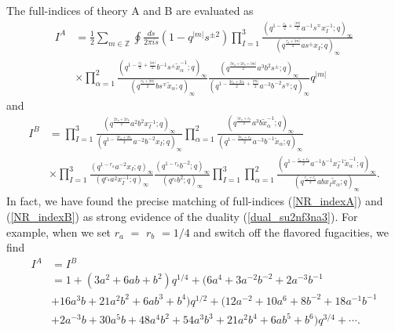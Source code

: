\documentclass[12pt]{article}
\numberwithin{equation}{section}
\begin{document}
The full-indices of theory A and B are evaluated as
\begin{align}
\label{NR_indexA}
I^A&=
\frac12 \sum_{m\in \mathbb{Z}}
\oint \frac{ds}{2\pi is}
(1-q^{|m|}s^{\pm2})
\prod_{I=1}^3 
\frac{
(q^{1-\frac{r_a}{2}+\frac{|m|}{2}}a^{-1}s^{\mp}x_{I}^{-1};q)_{\infty}
}
{
(q^{\frac{r_a+|m|}{2}}as^{\pm}x_{I};q)_{\infty}
}
\nonumber\\
&\times 
\prod_{\alpha=1}^2
\frac{
(q^{1-\frac{r_b}{2}+\frac{|m|}{2}}b^{-1}s^{\pm}\tilde{x}_{\alpha}^{-1};q)_{\infty}
}
{
(q^{\frac{r_b+|m|}{2}}bs^{\mp}\tilde{x}_{\alpha};q)_{\infty}
}
\frac{
(q^{\frac{3r_a+2r_b+|m|}{2}}a^3 b^2 s^{\pm};q)_{\infty}
}
{
(q^{1-\frac{3r_a+2r_b}{2}+\frac{|m|}{2}}a^{-3}b^{-2}s^{\mp};q)_{\infty}
}q^{|m|}
\end{align}
and 
\begin{align}
\label{NR_indexB}
I^B&=
\prod_{I=1}^3 
\frac{
(q^{\frac{2r_a+2r_b}{2}}a^2b^2x_I^{-1};q)_{\infty}
}
{
(q^{1-\frac{2r_a+2r_b}{2}}a^{-2}b^{-2}x_I;q)_{\infty}
}
\prod_{\alpha=1}^2
\frac{
(q^{\frac{3r_a+r_b}{2}}a^3b\tilde{x}_\alpha^{-1};q)_{\infty}
}
{
(q^{1-\frac{3r_a+r_b}{2}}a^{-3}b^{-1}\tilde{x}_\alpha;q)_{\infty}
}
\nonumber\\
&\times 
\prod_{I=1}^3 
\frac{
(q^{1-r_a}a^{-2}x_I;q)_{\infty}
}
{
(q^{r_a}a^2x_I^{-1};q)_{\infty}
}
\frac{
(q^{1-r_b}b^{-2};q)_{\infty}
}
{
(q^{r_b}b^2;q)_{\infty}
}
\prod_{I=1}^3
\prod_{\alpha=1}^2
\frac{
(q^{1-\frac{r_a+r_b}{2}}a^{-1}b^{-1}x_I^{-1}\tilde{x}_{\alpha}^{-1};q)_{\infty}
}
{
(q^{\frac{r_a+r_b}{2}}abx_I\tilde{x}_{\alpha};q)_{\infty}
}. 
\end{align}
In fact, we have found the precise matching of full-indices (\ref{NR_indexA}) and (\ref{NR_indexB}) as strong evidence of the duality (\ref{dual_su2nf3na3}). 
For example, when we set $r_a$ $=$ $r_b$ $=1/4$ and switch off the flavored fugacities, we find 
\begin{align}
I^A&=I^B
\nonumber\\
&=1+(3a^2+6ab+b^2)q^{1/4}
+(6a^4+3a^{-2}b^{-2}+2a^{-3}b^{-1}
\nonumber\\
&+16a^3b+21a^2b^2+6ab^3+b^4)q^{1/2}
+(12a^{-2}+10a^6+8b^{-2}+18a^{-1}b^{-1}
\nonumber\\
&+2a^{-3}b+30a^5b+48a^4b^2+54a^3b^3+21a^2b^4+6ab^5+b^6)q^{3/4}
+\cdots.
\end{align}

\end{document}
